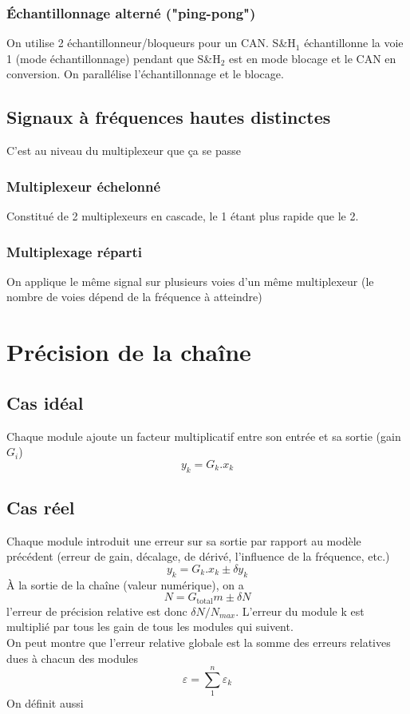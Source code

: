 \subsubsection{Échantillonnage alterné ("ping-pong")}
On utilise 2 échantillonneur/bloqueurs pour un CAN. S\&H\(_1\) échantillonne la voie 1 (mode échantillonnage) pendant que S\&H\(_2\) est en mode blocage et le CAN en conversion. On parallélise l'échantillonnage et le blocage.
\subsection{Signaux à fréquences hautes distinctes}
C'est au niveau du multiplexeur que ça se passe
\subsubsection{Multiplexeur échelonné}
Constitué de 2 multiplexeurs en cascade, le 1 étant plus rapide que le 2.
\subsubsection{Multiplexage réparti}
On applique le même signal sur plusieurs voies d'un même multiplexeur (le nombre de voies dépend de la fréquence à atteindre)
\section{Précision de la chaîne}
\subsection{Cas idéal}
Chaque module ajoute un facteur multiplicatif entre son entrée et sa sortie (gain \(G_i\))
\[y_k=G_k.x_k\]
\subsection{Cas réel}
Chaque module introduit une erreur sur sa sortie par rapport au modèle précédent (erreur de gain, décalage, de dérivé, l'influence de la fréquence, etc.)
\[y_k=G_k.x_k\pm \delta y_k\]
À la sortie de la chaîne (valeur numérique), on a
\[N=G_{\text{total}}m\pm\delta N\]
l'erreur de précision relative est donc \(\delta N/N_{max}\). L'erreur du module k est multiplié par tous les gain de tous les modules qui suivent.\\
On peut montre que l'erreur relative globale est la somme des erreurs relatives dues à chacun des modules
\[\varepsilon=\sum_1^n\varepsilon_k\]
On définit aussi

